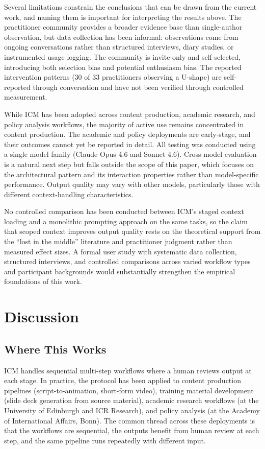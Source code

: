 \documentclass[acmlarge,nonacm,screen]{acmart}
\begin{document}
Several limitations constrain the conclusions that can be drawn from the current work, and naming them is important for interpreting the results above. The practitioner community provides a broader evidence base than single-author observation, but data collection has been informal: observations come from ongoing conversations rather than structured interviews, diary studies, or instrumented usage logging. The community is invite-only and self-selected, introducing both selection bias and potential enthusiasm bias. The reported intervention patterns (30 of 33 practitioners observing a U-shape) are self-reported through conversation and have not been verified through controlled measurement.

While ICM has been adopted across content production, academic research, and policy analysis workflows, the majority of active use remains concentrated in content production. The academic and policy deployments are early-stage, and their outcomes cannot yet be reported in detail. All testing was conducted using a single model family (Claude Opus 4.6 and Sonnet 4.6). Cross-model evaluation is a natural next step but falls outside the scope of this paper, which focuses on the architectural pattern and its interaction properties rather than model-specific performance. Output quality may vary with other models, particularly those with different context-handling characteristics.

No controlled comparison has been conducted between ICM's staged context loading and a monolithic prompting approach on the same tasks, so the claim that scoped context improves output quality rests on the theoretical support from the ``lost in the middle'' literature \cite{liu2024} and practitioner judgment rather than measured effect sizes. A formal user study with systematic data collection, structured interviews, and controlled comparisons across varied workflow types and participant backgrounds would substantially strengthen the empirical foundations of this work.

\section{Discussion}

\subsection{Where This Works}

ICM handles sequential multi-step workflows where a human reviews output at each stage. In practice, the protocol has been applied to content production pipelines (script-to-animation, short-form video), training material development (slide deck generation from source material), academic research workflows (at the University of Edinburgh and ICR Research), and policy analysis (at the Academy of International Affairs, Bonn). The common thread across these deployments is that the workflows are sequential, the outputs benefit from human review at each step, and the same pipeline runs repeatedly with different input.
\end{document}
